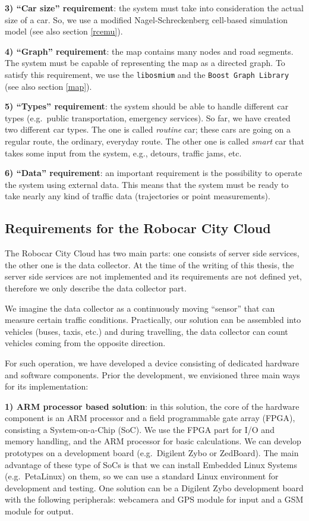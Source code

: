 \documentclass[b5paper,12pt]{report}
\theoremstyle{definition}
\begin{document}
{\bf{3) \enquote{Car size} requirement}}: the system must take into consideration the actual size of a car. So, we use a modified Nagel-Schreckenberg cell-based simulation model \cite{nasch} (see also section \ref{rcemu}).

{\bf{4) \enquote{Graph} requirement}}: the map contains many nodes and road segments. The system must be capable of representing the map as a directed graph. To satisfy this requirement, we use the \texttt{libosmium} and the \texttt{Boost Graph Library} (see also section \ref{map}).

{\bf{5) \enquote{Types} requirement}}: the system should be able to handle different car types (e.g.~public transportation, emergency services). So far, we have created two different car types. The one is called \textit{routine} car; these cars are going on a regular route, the ordinary, everyday route. The other one is called \textit{smart} car that takes some input from the system, e.g., detours, traffic jams, etc.

{\bf{6) \enquote{Data} requirement}}: an important requirement is the possibility to operate the system using external data. This means that the system must be ready to take nearly any kind of traffic data (trajectories or point measurements).

\subsection{Requirements for the Robocar City Cloud}

The Robocar City Cloud has two main parts: one consists of server side services, the other one is the data collector. At the time of the writing of this thesis, the server side services are not implemented and its requirements are not defined yet, therefore we only describe the data collector part.

We imagine the data collector as a continuously moving \enquote{sensor} that can measure certain traffic conditions. Practically, our solution can be assembled into vehicles (buses, taxis, etc.) and during travelling, the data collector can count vehicles coming from the opposite direction.

For such operation, we have developed a device consisting of dedicated hardware and software components. Prior the development, we envisioned three main ways for its implementation:

{\bf{1) ARM processor based solution}}: in this solution, the core of the hardware component is an ARM processor and a field programmable gate array (FPGA), consisting a System-on-a-Chip (SoC). We use the FPGA part for I/O and memory handling, and the ARM processor for basic calculations. We can develop prototypes on a development board (e.g.\ Digilent Zybo or ZedBoard). The main advantage of these type of SoCs is that we can install Embedded Linux Systems (e.g.\ PetaLinux) on them, so we can use a standard Linux environment for development and testing. 
One solution can be a Digilent Zybo development board with the following peripherals: webcamera and GPS module for input and a GSM module for output.
\end{document}

